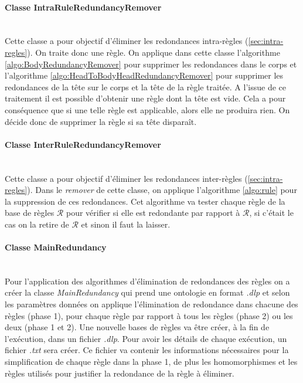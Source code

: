     \paragraph{Classe IntraRuleRedundancyRemover}\ \\
        Cette classe a pour objectif d'éliminer les redondances intra-règles (\ref{sec:intra-regles}). On traite donc une règle. On applique dans cette classe l'algorithme \ref{algo:BodyRedundancyRemover} pour supprimer les redondances dans le corps et l'algorithme \ref{algo:HeadToBodyHeadRedundancyRemover} pour supprimer les redondances de la tête sur le corps et la tête de la règle traitée. A l'issue de ce traitement il est possible d'obtenir une règle dont la tête est vide. Cela a pour conséquence que si une telle règle est applicable, alors elle ne produira rien. On décide donc de supprimer la règle si sa tête disparaît. 
         
    \paragraph{Classe InterRuleRedundancyRemover}\ \\
        Cette classe a pour objectif d'éliminer les redondances inter-règles (\ref{sec:intra-regles}). Dans le \textit{remover} de cette classe, on applique l'algorithme \ref{algo:rule} pour la suppression de ces redondances. Cet algorithme va tester chaque règle de la base de règles $\mathcal{R}$ pour vérifier si elle est redondante par rapport à $\mathcal{R}$, si c'était le cas on la retire de $\mathcal{R}$ et sinon il faut la laisser.
         
    \paragraph{Classe MainRedundancy}\ \\
         Pour l'application des algorithmes d'élimination de redondances des règles on a créer la classe \textit{MainRedundancy} qui prend une ontologie en format \textit{.dlp} et selon les paramètres données on applique l'élimination de redondance dans chacune des règles (phase 1), pour chaque règle par rapport à tous les règles (phase 2) ou les deux (phase 1 et 2). Une nouvelle bases de règles va être créer, à la fin de l'exécution, dans un fichier \textit{.dlp}. Pour avoir les détails de chaque exécution, un fichier \textit{.txt} sera créer. Ce fichier va contenir les informations nécessaires pour la simplification de chaque règle dans la phase 1, de plus les homomorphismes et les règles utilisés pour justifier la redondance de la règle à éliminer.
         
